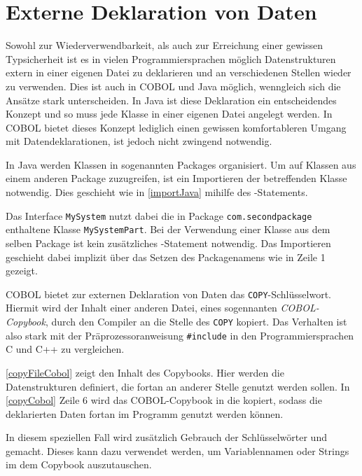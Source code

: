 \section{Externe Deklaration von Daten} 
  
Sowohl zur Wiederverwendbarkeit, als auch zur Erreichung einer gewissen Typsicherheit ist es in vielen Programmiersprachen möglich Datenstrukturen extern in einer eigenen Datei zu deklarieren und an verschiedenen Stellen wieder zu verwenden. Dies ist auch in COBOL und Java möglich, wenngleich sich die Ansätze stark unterscheiden. In Java ist diese Deklaration ein entscheidendes Konzept und so muss jede Klasse in einer eigenen Datei angelegt werden. In COBOL bietet dieses Konzept lediglich einen gewissen komfortableren Umgang mit Datendeklarationen, ist jedoch nicht zwingend notwendig.

In Java werden Klassen in sogenannten Packages organisiert. Um auf Klassen aus einem anderen Package zuzugreifen, ist ein Importieren der betreffenden Klasse notwendig. Dies geschieht wie in \autoref{importJava} mihilfe des -Statements.

Das Interface \texttt{MySystem} nutzt dabei die in Package \texttt{com.secondpackage} enthaltene Klasse \texttt{MySystemPart}. Bei der Verwendung einer Klasse aus dem selben Package ist kein zusätzliches -Statement notwendig. Das Importieren geschieht dabei implizit über das Setzen des Packagenamens wie in Zeile 1 gezeigt.

COBOL bietet zur externen Deklaration von Daten das \texttt{COPY}-Schlüsselwort. Hiermit wird der Inhalt einer anderen Datei, eines sogennanten \textit{COBOL-Copybook}, durch den Compiler an die Stelle des \texttt{COPY} kopiert. Das Verhalten ist also stark mit der Präprozessoranweisung \texttt{#include} in den Programmiersprachen C und C++ zu vergleichen.

\autoref{copyFileCobol} zeigt den Inhalt des Copybooks. Hier werden die Datenstrukturen definiert, die fortan an anderer Stelle genutzt werden sollen. In \autoref{copyCobol} Zeile 6 wird das COBOL-Copybook in die  kopiert, sodass die deklarierten Daten fortan im Programm genutzt werden können.

In diesem speziellen Fall wird zusätzlich Gebrauch der Schlüsselwörter  und  gemacht. Dieses kann dazu verwendet werden, um Variablennamen oder Strings im dem Copybook auszutauschen.

